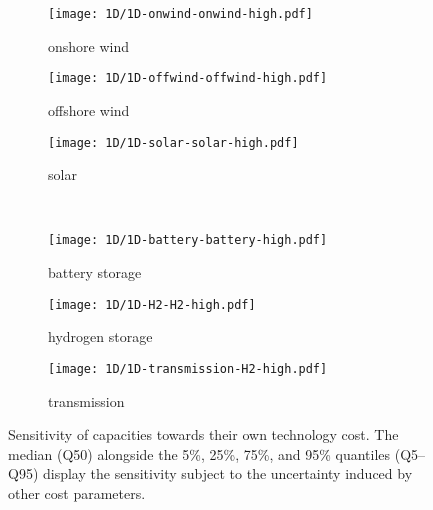 \begin{figure}
    \begin{subfigure}[t]{0.32\textwidth}
        \caption{onshore wind}
        \texttt{[image: 1D/1D-onwind-onwind-high.pdf]}
    \end{subfigure}
    \begin{subfigure}[t]{0.32\textwidth}
        \caption{offshore wind}
        \texttt{[image: 1D/1D-offwind-offwind-high.pdf]}
    \end{subfigure}
    \begin{subfigure}[t]{0.32\textwidth}
        \caption{solar}
        \texttt{[image: 1D/1D-solar-solar-high.pdf]}
    \end{subfigure} \\
    \begin{subfigure}[t]{0.32\textwidth}
        \caption{battery storage}
        \texttt{[image: 1D/1D-battery-battery-high.pdf]}
    \end{subfigure}
    \begin{subfigure}[t]{0.32\textwidth}
        \caption{hydrogen storage}
        \texttt{[image: 1D/1D-H2-H2-high.pdf]}
    \end{subfigure}
    \begin{subfigure}[t]{0.32\textwidth}
        \caption{transmission}
        \texttt{[image: 1D/1D-transmission-H2-high.pdf]}
    \end{subfigure}
    \vspace{-0.3cm}
    \caption{
      Sensitivity of capacities towards their own technology cost.
      The median (Q50) alongside the 5\%, 25\%, 75\%, and 95\% quantiles (Q5--Q95) display
      the sensitivity subject to the uncertainty induced by other cost parameters.
    }
    \label{fig:sensitivity}
\end{figure}

